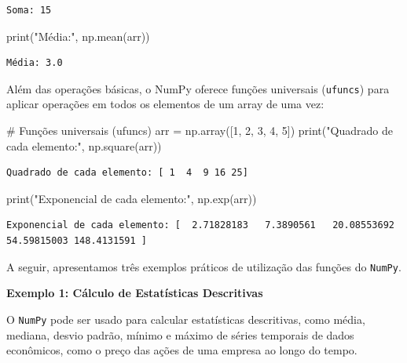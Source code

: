 \documentclass[
  portuguese,
  letterpaper,
  DIV=11,
  numbers=noendperiod]{scrreprt}
\newenvironment{Shaded}{\begin{snugshade}}{\end{snugshade}}
\newcommand{\BuiltInTok}[1]{\textcolor[rgb]{0.00,0.23,0.31}{#1}}
\newcommand{\CommentTok}[1]{\textcolor[rgb]{0.37,0.37,0.37}{#1}}
\newcommand{\DecValTok}[1]{\textcolor[rgb]{0.68,0.00,0.00}{#1}}
\newcommand{\NormalTok}[1]{\textcolor[rgb]{0.00,0.23,0.31}{#1}}
\newcommand{\OperatorTok}[1]{\textcolor[rgb]{0.37,0.37,0.37}{#1}}
\newcommand{\StringTok}[1]{\textcolor[rgb]{0.13,0.47,0.30}{#1}}
\theoremstyle{definition}
\theoremstyle{remark}
\begin{document}
\begin{verbatim}
Soma: 15
\end{verbatim}

\begin{Shaded}
\begin{Highlighting}[]
\BuiltInTok{print}\NormalTok{(}\StringTok{"Média:"}\NormalTok{, np.mean(arr))}
\end{Highlighting}
\end{Shaded}

\begin{verbatim}
Média: 3.0
\end{verbatim}

Além das operações básicas, o NumPy oferece funções universais
(\texttt{ufuncs}) para aplicar operações em todos os elementos de um
array de uma vez:

\begin{Shaded}
\begin{Highlighting}[]
\CommentTok{\# Funções universais (ufuncs)}
\NormalTok{arr }\OperatorTok{=}\NormalTok{ np.array([}\DecValTok{1}\NormalTok{, }\DecValTok{2}\NormalTok{, }\DecValTok{3}\NormalTok{, }\DecValTok{4}\NormalTok{, }\DecValTok{5}\NormalTok{])}
\BuiltInTok{print}\NormalTok{(}\StringTok{"Quadrado de cada elemento:"}\NormalTok{, np.square(arr))}
\end{Highlighting}
\end{Shaded}

\begin{verbatim}
Quadrado de cada elemento: [ 1  4  9 16 25]
\end{verbatim}

\begin{Shaded}
\begin{Highlighting}[]
\BuiltInTok{print}\NormalTok{(}\StringTok{"Exponencial de cada elemento:"}\NormalTok{, np.exp(arr))}
\end{Highlighting}
\end{Shaded}

\begin{verbatim}
Exponencial de cada elemento: [  2.71828183   7.3890561   20.08553692  54.59815003 148.4131591 ]
\end{verbatim}

A seguir, apresentamos três exemplos práticos de utilização das funções
do \texttt{NumPy}.

\textbf{Exemplo 1: Cálculo de Estatísticas Descritivas}

O \texttt{NumPy} pode ser usado para calcular estatísticas descritivas,
como média, mediana, desvio padrão, mínimo e máximo de séries temporais
de dados econômicos, como o preço das ações de uma empresa ao longo do
tempo.
\end{document}
